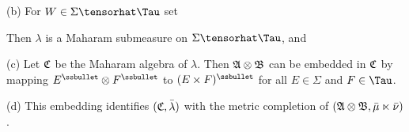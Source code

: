 (b) For $W\in\Sigma\tensorhat\Tau$ set


\noindent Then $\lambda$ is a Maharam submeasure on $\Sigma\tensorhat\Tau$,
and


(c) Let $\frak C$ be the Maharam algebra of $\lambda$.   Then
$\frak A\otimes\frak B$ can be embedded in $\frak C$ by mapping
$E^{\ssbullet}\otimes F^{\ssbullet}$ to $(E\times F)^{\ssbullet}$ for all
$E\in\Sigma$ and $F\in\Tau$.

(d) This embedding identifies $(\frak C,\bar\lambda)$ with the metric
completion of $(\frak A\otimes\frak B,\bar\mu\ltimes\bar\nu)$.

